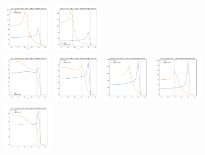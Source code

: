 \documentclass[a4paper]{article}
\begin{document}
\begin{figure}[H]
  \includegraphics[width=0.23\textwidth]{grid-g6-v4-w3_0}
  \includegraphics[width=0.23\textwidth]{grid-g6-v4-w4_0}
  \\
  \includegraphics[width=0.23\textwidth]{grid-g6-v5-w1_0}
  \includegraphics[width=0.23\textwidth]{grid-g6-v5-w2_0}
  \includegraphics[width=0.23\textwidth]{grid-g6-v5-w3_0}
  \includegraphics[width=0.23\textwidth]{grid-g6-v5-w4_0}
  \\
  \includegraphics[width=0.23\textwidth]{grid-g6-v6-w1_0}

\end{figure}
\end{document}
